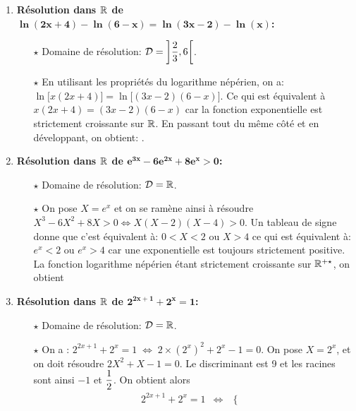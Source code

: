 \documentclass[a4paper, 11pt]{article}
\begin{document}
\begin{correction}
\begin{enumerate}
\begin{itemize}
\end{itemize}
\item \textbf{R\'esolution dans $\mathbf{\R}$ de $\mathbf{\ln{(2x+4)} -\ln{(6-x)}=\ln{(3x-2)}-\ln{(x)}}$:}\\
\noindent \begin{itemize}
\item[$\star$] Domaine de r\'esolution: $\mathcal{D}=\left\rbrack \ddp\frac{2}{3},6\right\lbrack$.
\item[$\star$] En utilisant les propri\'et\'es du logarithme n\'ep\'erien, on a: $\ln{\lbrack x(2x+4)\rbrack}=\ln{\lbrack (3x-2)(6-x)\rbrack}$. Ce qui est \'equivalent \`{a} $x(2x+4)=(3x-2)(6-x)$ car la fonction exponentielle est strictement croissante sur $\R$. En passant tout du m\^{e}me c\^{o}t\'e et en d\'eveloppant, on obtient: .
\end{itemize} 
\item \textbf{R\'esolution dans $\mathbf{\R}$ de $\mathbf{e^{3x}-6e^{2x}+8e^x>0}$:}\\
\noindent \begin{itemize}
\item[$\star$] Domaine de r\'esolution: $\mathcal{D}=\R$.
\item[$\star$] On pose $X=e^x$ et on se ram\`{e}ne ainsi \`{a} r\'esoudre $X^3-6X^2+8X>0\Leftrightarrow X(X-2)(X-4)>0$. Un tableau de signe donne que c'est \'equivalent \`{a}: $0<X<2$ ou $X>4$ ce qui est \'equivalent \`{a}: $e^x<2$ ou $e^x>4$ car une exponentielle est toujours strictement positive. La fonction logarithme n\'ep\'erien \'etant strictement  croissante sur $\R^{+\star}$, on obtient 
\end{itemize} 
\item \textbf{R\'esolution dans $\mathbf{\R}$ de $\mathbf{2^{2x+1}+2^x=1}$:}\\
\noindent \begin{itemize}
\item[$\star$] Domaine de r\'esolution: $\mathcal{D}=\R$.
\item[$\star$] 
On a  :  $2^{2x+1}+2^x=1  \; \Leftrightarrow \; 2\times (2^x)^2+2^x-1=0$. On pose $X=2^x$, et on doit r\'esoudre $2X^2+X-1=0.$
Le discriminant est 9 et les racines sont ainsi $-1$ et $\ddp\demi$.
On obtient alors 
$$\begin{array}{llll}
2^{2x+1}+2^x=1& \Leftrightarrow &\left\lbrace\begin{array}{lll}

\end{array}
\end{array}$$
\end{itemize}
\end{enumerate}
\end{correction}
\end{document}
